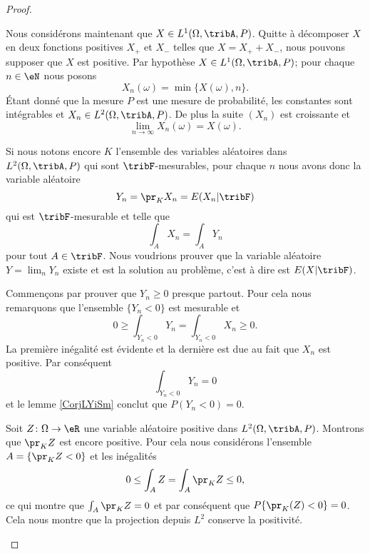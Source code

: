 \begin{proof}
\begin{description}
            Nous considérons maintenant que \( X\in L^1(\Omega,\tribA,P)\). Quitte à décomposer \( X\) en deux fonctions positives \( X_+\) et \( X_-\) telles que \( X=X_++X_-\), nous pouvons supposer que \( X\) est positive. Par hypothèse \( X\in L^1(\Omega,\tribA,P)\); pour chaque \( n\in\eN\) nous posons
            \begin{equation}
                X_n(\omega)=\min\{ X(\omega),n \}.
            \end{equation}
            Étant donné que la mesure \( P\) est une mesure de probabilité, les constantes sont intégrables et \( X_n\in L^2(\Omega,\tribA,P)\). De plus la suite \( (X_n)\) est croissante et
            \begin{equation}
                \lim_{n\to \infty} X_n(\omega)=X(\omega).
            \end{equation}

            Si nous notons encore \( K\) l'ensemble des variables aléatoires dans \( L^2(\Omega,\tribA,P)\) qui sont \( \tribF\)-mesurables, pour chaque \( n\) nous avons donc la variable aléatoire 
            \begin{equation}
                Y_n=\pr_KX_n=E(X_n|\tribF)
            \end{equation}
            qui est \( \tribF\)-mesurable et telle que
            \begin{equation}
                \int_A X_n=\int_AY_n
            \end{equation}
            pour tout \( A\in\tribF\). Nous voudrions prouver que la variable aléatoire \( Y=\lim_nY_n\) existe et est la solution au problème, c'est à dire est \( E(X|\tribF)\). 

            Commençons par prouver que \( Y_n\geq 0\) presque partout. Pour cela nous remarquons que l'ensemble \( \{ Y_n<0 \}\) est mesurable et
            \begin{equation}
                0\geq\int_{Y_n<0}Y_n=\int_{Y_n<0}X_n\geq 0.
            \end{equation}
            La première inégalité est évidente et la dernière est due au fait que \( X_n\) est positive. Par conséquent
            \begin{equation}
                \int_{Y_n<0}Y_n=0
            \end{equation}
            et le lemme \ref{CorjLYiSm} conclut que \( P(Y_n<0)=0\).

            Soit \( Z\colon \Omega\to \eR\) une variable aléatoire positive dans \( L^2(\Omega,\tribA,P)\). Montrons que \( \pr_KZ\) est encore positive. Pour cela nous considérons l'ensemble \( A=\{ \pr_KZ<0 \}\) et les inégalités
            \begin{equation}
                0\leq \int_AZ=\int_A\pr_KZ\leq 0,
            \end{equation}
            ce qui montre que \( \int_A\pr_KZ=0\) et par conséquent que \( P\{ \pr_K(Z)<0 \}=0\). Cela nous montre que la projection depuis \( L^2\) conserve la positivité.


\end{description}
\end{proof}
